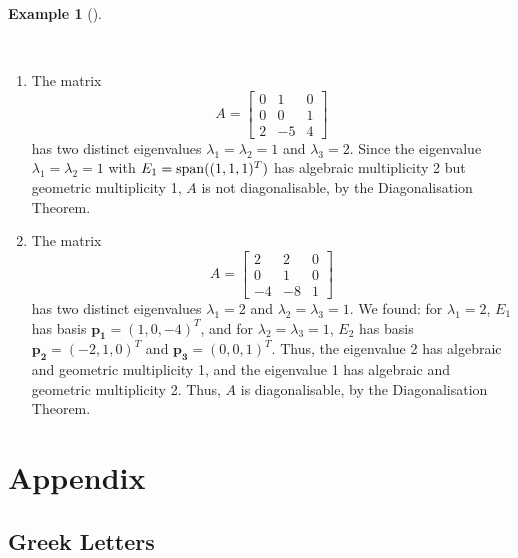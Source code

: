 \documentclass[
  a4paper,
  DIV=11,
  numbers=noendperiod,
  oneside]{scrreprt}
\providecommand{\tightlist}{%
  \setlength{\itemsep}{0pt}\setlength{\parskip}{0pt}}
\theoremstyle{definition}
\newtheorem{example}{Example}[chapter]
\theoremstyle{remark}
\begin{document}
\begin{example}[]\protect\hypertarget{exm-}{}\label{exm-}

~

\begin{enumerate}
\def\labelenumi{(\alph{enumi})}
\tightlist
\item
  The matrix \[A = \left[\begin{array}{ccc}
      0 & 1 & 0 \\ 0 & 0 & 1 \\ 2 & -5 & 4 \end{array}\right]\] has two
  distinct eigenvalues \(\lambda _{1} = \lambda _{2} = 1\) and
  \(\lambda _{3} = 2\). Since the eigenvalue
  \(\lambda _{1} = \lambda _{2} = 1\) with
  \(E_{1} = {\rm span}( (1,1,1)^T)\) has algebraic multiplicity 2 but
  geometric multiplicity 1, \(A\) is not diagonalisable, by the
  Diagonalisation Theorem.\\
\item
  The matrix \[A = \left[\begin{array}{ccc}
      2 & 2 & 0 \\ 0 & 1 & 0 \\ -4 & -8 & 1 \end{array}\right]\] has two
  distinct eigenvalues \(\lambda _{1} = 2\) and
  \(\lambda _{2} = \lambda _{3} = 1\). We found: for
  \(\lambda _{1} = 2\), \(E_{1}\) has basis
  \(\mathbf{p_{1}} = (1, 0, -4)^T\), and for
  \(\lambda _{2} = \lambda _{3} = 1\), \(E_{2}\) has basis
  \(\mathbf{p_{2}} = (-2,1, 0)^T\) and \(\mathbf{p_{3}} = (0,0,1)^T\).
  Thus, the eigenvalue 2 has algebraic and geometric multiplicity 1, and
  the eigenvalue 1 has algebraic and geometric multiplicity 2. Thus,
  \(A\) is diagonalisable, by the Diagonalisation Theorem.
\end{enumerate}

\end{example}

\chapter{Appendix}\label{appendix}

\section{Greek Letters}\label{sec-greekletters}
\end{document}
